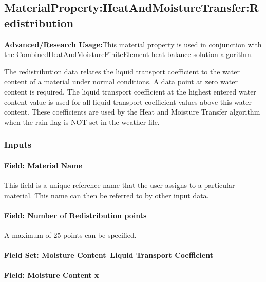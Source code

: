 \subsection{MaterialProperty:HeatAndMoistureTransfer:Redistribution}\label{materialpropertyheatandmoisturetransferredistribution}

\textbf{Advanced/Research Usage:}This material property is used in conjunction with the CombinedHeatAndMoistureFiniteElement heat balance solution algorithm.

The redistribution data relates the liquid transport coefficient to the water content of a material under normal conditions. A data point at zero water content is required. The liquid transport coefficient at the highest entered water content value is used for all liquid transport coefficient values above this water content. These coefficients are used by the Heat and Moisture Transfer algorithm when the rain flag is NOT set in the weather file.

\subsubsection{Inputs}\label{inputs-10-020}

\paragraph{Field: Material Name}\label{field-material-name-3}

This field is a unique reference name that the user assigns to a particular material. This name can then be referred to by other input data.

\paragraph{Field: Number of Redistribution points}\label{field-number-of-redistribution-points}

A maximum of 25 points can be specified.

\paragraph{Field Set: Moisture Content--Liquid Transport Coefficient}\label{field-set-moisture-content-liquid-transport-coefficient-1}

\paragraph{Field: Moisture Content x}\label{field-moisture-content-x-2}

